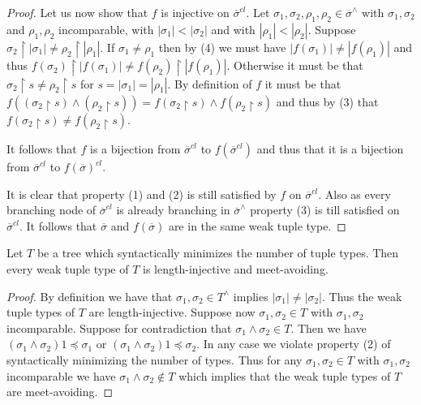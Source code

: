 \begin{proof}
Let us now show that $f$ is injective on $\overline{\sigma}^{cl}$. Let $\sigma_1,\sigma_2, \rho_1, \rho_2 \in \overline{\sigma}^{\wedge}$ with $\sigma_1,\sigma_2$ and $\rho_1,\rho_2$ incomparable, with $|\sigma_1| < |\sigma_2|$ and with $|\rho_1| < |\rho_2|$. Suppose $\sigma_2 \upharpoonright {|\sigma_1|} \neq \rho_2 \upharpoonright {|\rho_1|}$. If $\sigma_1 \neq \rho_1$ then by (4) we must have $|f(\sigma_1)| \neq |f(\rho_1)|$ and thus $f(\sigma_2)  \upharpoonright {|f(\sigma_1)|} \neq f(\rho_2)  \upharpoonright {|f(\rho_1)|}$. Otherwise it must be that $\sigma_2 \upharpoonright {s} \neq \rho_2 \upharpoonright {s}$ for $s = |\sigma_1| = |\rho_1|$. By definition of $f$ it must be that $f((\sigma_2 \upharpoonright {s}) \wedge (\rho_2 \upharpoonright {s})) = f(\sigma_2 \upharpoonright {s}) \wedge f(\rho_2 \upharpoonright {s})$ and thus by (3) that $f(\sigma_2 \upharpoonright {s}) \neq f(\rho_2 \upharpoonright {s})$. 

It follows that $f$ is a bijection from $\overline{\sigma}^{cl}$ to $f(\overline{\sigma}^{cl})$ and thus that it is a bijection from $\overline{\sigma}^{cl}$ to $f(\overline{\sigma})^{cl}$.

It is clear that property (1) and (2) is still satisfied by $f$ on $\overline{\sigma}^{cl}$. Also as every branching node of $\overline{\sigma}^{cl}$ is already branching in $\overline{\sigma}^{\wedge}$ property (3) is till satisfied on $\overline{\sigma}^{cl}$. It follows that $\overline{\sigma}$ and $f(\overline{\sigma})$ are in the same weak tuple type.
\end{proof}

\begin{lemma} \label{lem:realizeall_smntt}
Let $T$ be a tree which syntactically minimizes the number of tuple types. Then every weak tuple type of $T$ is length-injective and meet-avoiding.
\end{lemma}
\begin{proof}
By definition we have that $\sigma_1,\sigma_2 \in T^{\wedge}$ implies $|\sigma_1| \neq |\sigma_2|$. Thus the weak tuple types of $T$ are length-injective. Suppose now $\sigma_1,\sigma_2 \in T$ with $\sigma_1,\sigma_2$ incomparable. Suppose for contradiction that $\sigma_1 \wedge \sigma_2 \in T$. Then we have $(\sigma_1 \wedge \sigma_2) 1 \preceq \sigma_1$ or $(\sigma_1 \wedge \sigma_2) 1 \preceq \sigma_2$. In any case we violate property (2) of syntactically minimizing the number of types. Thus for any $\sigma_1,\sigma_2 \in T$ with $\sigma_1,\sigma_2$ incomparable we have $\sigma_1 \wedge \sigma_2 \notin T$ which implies that the weak tuple types of $T$ are meet-avoiding.
\end{proof}

